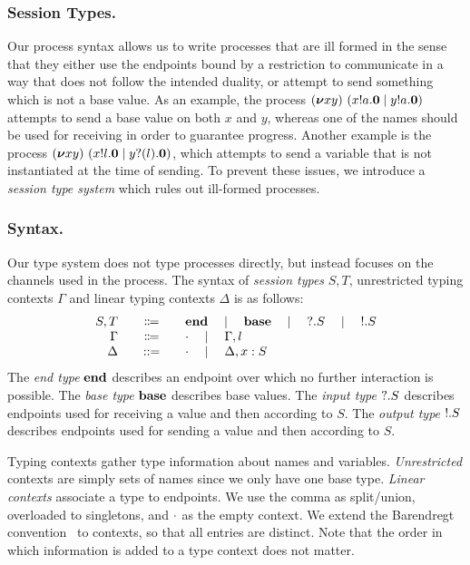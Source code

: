 \subsubsection{Session Types.}
Our process syntax allows us to write processes that are ill formed in
the sense that they either use the endpoints bound by a restriction to
communicate in a way that does not follow the intended duality, or
attempt to send something which is not a base value.  As an example,
the process
\( (\bm{\nu} xy)~(x ! a . \bm{0} \mid y ! a . \bm{0}) \)
attempts to send a base value on both \( x \) and \( y\), whereas one
of the names should be used for receiving in order to guarantee
progress.  Another example is the process
\( (\bm{\nu} xy)~(x ! l . \bm{0} \mid y ? (l) . \bm{0}) \),
which attempts to send a variable that is not instantiated at the time
of sending.
%
To prevent these issues, we introduce a \emph{session type system} which
rules out ill-formed processes.

\subsubsection{Syntax.}
Our type system does not type processes directly, but instead focuses on the channels used in the process.
The syntax of \emph{session types} \( S, T \), unrestricted typing contexts \( \Gamma \) and linear typing contexts \( \Delta \) is as follows:
\[
  \begin{array}{r@{\qquad}c@{\qquad}l}
  S,T & \Coloneqq & \Tend \quad\mid\quad \Tbase \quad\mid\quad \Tin{S} \quad\mid\quad \Tout{S} \\
    \Gamma & \Coloneqq & \Cempty \quad\mid\quad \Gamma, l \\
                    \Delta &::= & \Cempty \quad\mid\quad \Cadd{\Delta}{\hastype{x}{S}}
  \end{array}
\]
The \emph{end type} \( \mathbf{end} \) describes an endpoint over which no further interaction is possible.
The \emph{base type} \( \mathbf{base} \) describes base values.
The \emph{input type} \( {?}.S \) describes endpoints used for receiving a value and then according to \( S \).
The \emph{output type} \( {!}.S \) describes endpoints used for sending a value and then according to \( S \).

Typing contexts gather type information about names and variables.
\emph{Unrestricted} contexts are simply sets of names since we only have one
base type. \emph{Linear contexts} associate a type to endpoints. We use
the comma as split/union, overloaded to singletons, and \( \cdot \) as the
empty context. We extend the Barendregt convention~\cite{Barendregt1984} to contexts, so that all
entries are distinct.  Note that the order in which information is added to a
type context does not matter.

